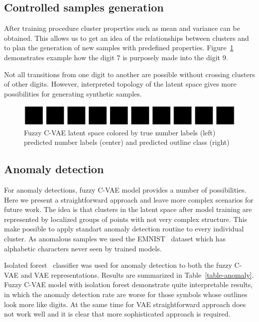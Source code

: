 \documentclass[runningheads]{llncs}
\begin{document}
\subsection{Controlled samples generation}

After training procedure cluster properties such as mean and variance can be obtained.
This allows us to get an idea of the relationships between clusters and to plan the generation of new samples with predefined properties.
Figure~\ref{fig:samples-generation} demonstrates example how the digit 7 is purposely made into the digit 9. 

Not all transitions from one digit to another are possible without crossing clusters of other digits.
However, interpreted topology of the latent space gives more possibilities for generating synthetic samples.

\begin{figure} 
    \centering
    \includegraphics[width=1\textwidth]{fig4-sample-generation.eps}
    \caption{Fuzzy C-VAE latent space colored by true number labels (left) predicted number labels (center) and predicted outline class (right) }
    \label{fig:samples-generation}
\end{figure}

\subsection{Anomaly detection}

For anomaly detections, fuzzy C-VAE model provides a number of possibilities. 
Here we present a straightforward approach and leave more complex scenarios for future work.
The idea is that clusters in the latent space after model training are represented by localized groups of points with not very complex structure.
This make possible to apply standart anomaly detection routine to every individual cluster.
As anomalous samples we used the EMNIST~\cite{cohenafshartapsonschaik2017} dataset which has alphabetic characters never seen by trained models.

Isolated forest~\cite{LiuIsoforest} classifier was used for anomaly detection to both the fuzzy C-VAE and VAE representations.
Results are summarized in Table~\ref{table-anomaly}.
Fuzzy C-VAE model with isolation forest demonstrate quite interpretable results, in which the anomaly detection rate are worse for those symbols whose outlines look more like digits.
At the same time for VAE straightforward approach does not work well and it is clear that more sophisticated approach is required.
\end{document}
